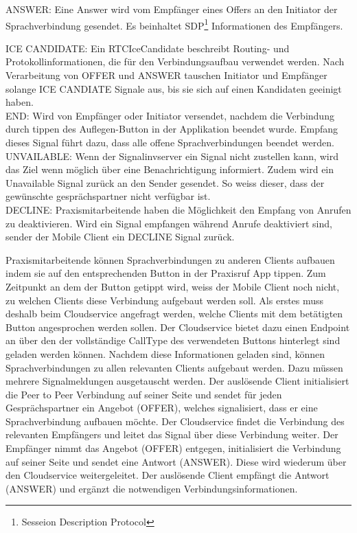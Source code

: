 ANSWER: Eine Answer wird vom Empfänger eines Offers an den Initiator der Sprachverbindung gesendet.
Es beinhaltet SDP\footnote{Sesseion Description Protocol} Informationen des Empfängers.

ICE CANDIDATE: Ein RTCIceCandidate beschreibt Routing- und Protokollinformationen, die für den Verbindungsaufbau verwendet werden.
Nach Verarbeitung von OFFER und ANSWER tauschen Initiator und Empfänger solange ICE CANDIATE Signale aus, bis sie sich auf einen Kandidaten geeinigt haben.\\

END: Wird von Empfänger oder Initiator versendet, nachdem die Verbindung durch tippen des Auflegen-Button in der Applikation beendet wurde.
Empfang dieses Signal führt dazu, dass alle offene Sprachverbindungen beendet werden.\\

UNVAILABLE: Wenn der Signalinvserver ein Signal nicht zustellen kann, wird das Ziel wenn möglich über eine Benachrichtigung informiert.
Zudem wird ein Unavailable Signal zurück an den Sender gesendet.
So weiss dieser, dass der gewünschte gesprächspartner nicht verfügbar ist. \\

DECLINE: Praxismitarbeitende haben die Möglichkeit den Empfang von Anrufen zu deaktivieren.
Wird ein Signal empfangen während Anrufe deaktiviert sind, sender der Mobile Client ein DECLINE Signal zurück. \\

\clearpage

Praxismitarbeitende können Sprachverbindungen zu anderen Clients aufbauen indem sie auf den entsprechenden Button in der Praxisruf App tippen.
Zum Zeitpunkt an dem der Button getippt wird, weiss der Mobile Client noch nicht, zu welchen Clients diese Verbindung aufgebaut werden soll.
Als erstes muss deshalb beim Cloudservice angefragt werden, welche Clients mit dem betätigten Button angesprochen werden sollen.
Der Cloudservice bietet dazu einen Endpoint an über den der vollständige CallType des verwendeten Buttons hinterlegt sind geladen werden können.
Nachdem diese Informationen geladen sind, können Sprachverbindungen zu allen relevanten Clients aufgebaut werden.
Dazu müssen mehrere Signalmeldungen ausgetauscht werden.
Der auslösende Client initialisiert die Peer to Peer Verbindung auf seiner Seite und sendet für jeden Gesprächspartner ein Angebot (OFFER), welches signalisiert, dass er eine Sprachverbindung aufbauen möchte.
Der Cloudservice findet die Verbindung des relevanten Empfängers und leitet das Signal über diese Verbindung weiter.
Der Empfänger nimmt das Angebot (OFFER) entgegen, initialisiert die Verbindung auf seiner Seite und sendet eine Antwort (ANSWER).
Diese wird wiederum über den Cloudservice weitergeleitet.
Der auslösende Client empfängt die Antwort (ANSWER) und ergänzt die notwendigen Verbindungsinformationen.

